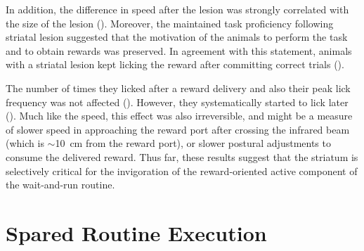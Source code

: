 In addition, the difference in speed after the lesion was strongly correlated with the size of the lesion ().
Moreover, the maintained task proficiency following striatal lesion suggested that the motivation of the animals to perform the task and to obtain rewards was preserved.
In agreement with this statement, animals with a striatal lesion kept licking the reward after committing correct trials ().

The number of times they licked after a reward delivery and also their peak lick frequency was not affected ().
However, they systematically started to lick later ().
Much like the speed, this effect was also irreversible, and might be a measure of slower speed in approaching the reward port after crossing the infrared beam (which is $\sim$10~cm from the reward port), or slower postural adjustments to consume the delivered reward.
Thus far, these results suggest that the striatum is selectively critical for the invigoration of the reward-oriented active component of the wait-and-run routine.


\section{Spared Routine Execution}
\label{ch:lesion:rev}

